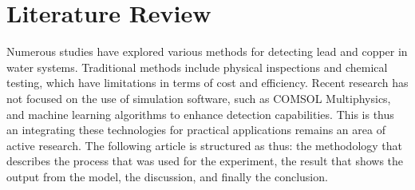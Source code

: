 
\chapter{Literature Review} 
\label{ch:lit}
\noindent
Numerous studies have explored various methods for detecting lead and copper in water systems. Traditional methods include physical inspections and chemical testing, which have limitations in terms of cost and efficiency. Recent research has not focused on the use of simulation software, such as COMSOL Multiphysics, and machine learning algorithms to enhance detection capabilities. This is thus an integrating these technologies for practical applications remains an area of active research. The following article is structured as thus: the methodology that describes the process that was used for the experiment, the result that shows the output from the model, the discussion, and finally the conclusion.


% 				
% 


